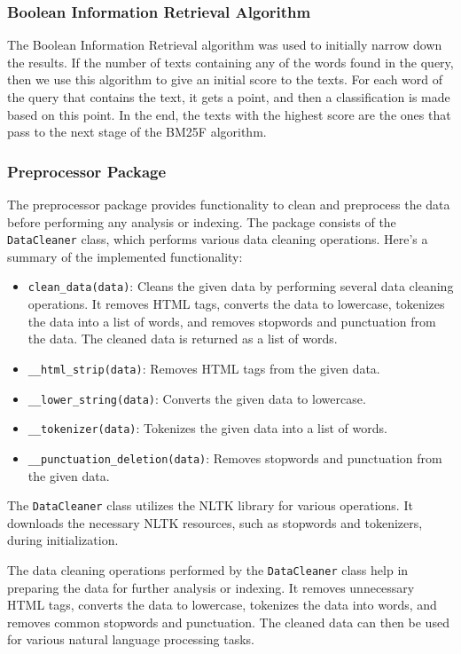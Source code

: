 \documentclass{article}
\begin{document}
\subsubsection{Boolean Information Retrieval Algorithm}
The Boolean Information Retrieval algorithm was used to initially narrow down the results. 
If the number of texts containing any of the words found in the query, then we use this 
algorithm to give an initial score to the texts. For each word of the query that contains 
the text, it gets a point, and then a classification is made based on this point. In the end, 
the texts with the highest score are the ones that pass to the next stage of the BM25F algorithm.

\subsubsection{Preprocessor Package}

The preprocessor package provides functionality to clean and preprocess the data before 
performing any analysis or indexing. The package consists of the \texttt{DataCleaner} class, 
which performs various data cleaning operations. Here's a summary of the implemented 
functionality:

\begin{itemize}
    \item \texttt{clean\_data(data)}: Cleans the given data by performing several data cleaning 
    operations. It removes HTML tags, converts the data to lowercase, tokenizes the data into a 
    list of words, and removes stopwords and punctuation from the data. The cleaned data is 
    returned as a list of words.
    \item \texttt{\_\_html\_strip(data)}: Removes HTML tags from the given data.
    \item \texttt{\_\_lower\_string(data)}: Converts the given data to lowercase.
    \item \texttt{\_\_tokenizer(data)}: Tokenizes the given data into a list of words.
    \item \texttt{\_\_punctuation\_deletion(data)}: Removes stopwords and punctuation from the 
    given data.
\end{itemize}

The \texttt{DataCleaner} class utilizes the NLTK library for various operations. It downloads 
the necessary NLTK resources, such as stopwords and tokenizers, during initialization.

The data cleaning operations performed by the \texttt{DataCleaner} class help in preparing the 
data for further analysis or indexing. It removes unnecessary HTML tags, converts the data to 
lowercase, tokenizes the data into words, and removes common stopwords and punctuation. The 
cleaned data can then be used for various natural language processing tasks.
\end{document}
